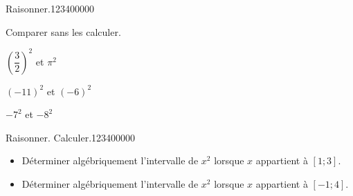 \begin{pageAD}

\begin{ExoCad}{Raisonner.}{1234}{0}{0}{0}{0}{0}

Comparer sans les calculer.
\begin{description}[leftmargin=*]
\item $\left( \dfrac{3}{2} \right)^2$ et  $\pi^2$



\item $(-11)^2$ et $(-6)^2$



 
\item $-7^2$ et $-8^2$


\end{description}

\end{ExoCad} 


\begin{ExoCad}{Raisonner. Calculer.}{1234}{0}{0}{0}{0}{0}
\begin{itemize}[leftmargin=*]
\item Déterminer algébriquement l'intervalle de $x^2$ lorsque $x$ appartient à $[1;3]$. 


%
%
%
%
\item Déterminer algébriquement l'intervalle de $x^2$ lorsque $x$ appartient à $\left[-1;4 \right]$. 


\end{itemize}
\end{ExoCad}
\end{pageAD}
